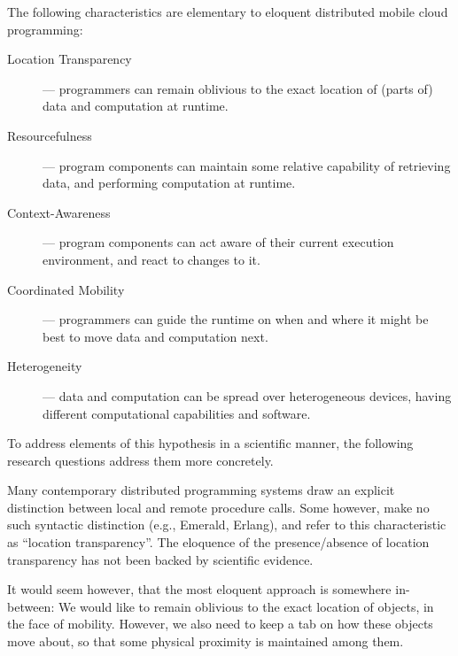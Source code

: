 \begin{hypothesis}

\label{hyp:main}

The following characteristics are elementary to eloquent distributed
mobile cloud programming:

\begin{description}

\item[Location Transparency] --- programmers can remain oblivious to
the exact location of (parts of) data and computation at runtime.

\item[Resourcefulness] --- program components can maintain some
relative capability of retrieving data, and performing computation at
runtime.

\item[Context-Awareness] --- program components can act aware of their
current execution environment, and react to changes to it.

\item[Coordinated Mobility] --- programmers can guide the runtime on
when and where it might be best to move data and computation next.

\item[Heterogeneity] --- data and computation can be spread over
heterogeneous devices, having different computational capabilities and
software.

\end{description}

\end{hypothesis}

To address elements of this hypothesis in a scientific manner, the
following research questions address them more concretely.

\bigskip

Many contemporary distributed programming systems draw an explicit
distinction between local and remote procedure calls. Some however,
make no such syntactic distinction (e.g.,
Emerald\cite{emerald:tocs:1988, emerald:tse:1987, emerald:spe:1991},
Erlang\cite{2003-PhD-Armstrong}), and refer to this characteristic as
``location transparency''. The eloquence of the presence/absence of
location transparency has not been backed by scientific evidence.

It would seem however, that the most eloquent approach is somewhere
in-between: We would like to remain oblivious to the exact location of
objects, in the face of mobility. However, we also need to keep a tab
on how these objects move about, so that some physical proximity is
maintained among them.

